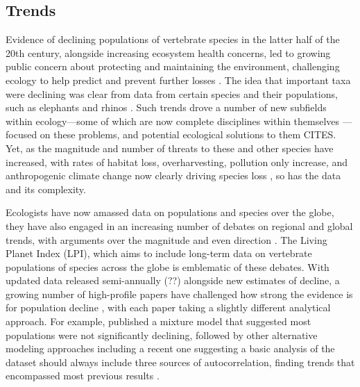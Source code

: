 \documentclass[11pt]{article}
\begin{document}
\subsection{Trends}

Evidence of declining populations of vertebrate species in the latter half of the 20th century, alongside increasing ecosystem health concerns, led to growing public concern about protecting and maintaining the environment, challenging ecology to help predict and prevent further losses \citep{soule1999conserving,soule1991conservation}. The idea that important taxa were declining was clear from data from certain species and their populations, such as elephants and rhinos \citep{soule1979benign,leader1990illegal}. Such trends drove a number of new subfields within ecology---some of which are now complete disciplines within themselves \citep[such as conservation biology,][]{soule1985conservation}---focused on these problems, and potential ecological solutions to them CITES. Yet, as the magnitude and number of threats to these and other species have increased, with rates of habitat loss, overharvesting, pollution only increase, and anthropogenic climate change now clearly driving species loss \citep{waller2017bramble}, so has the data and its complexity. 

Ecologists have now amassed data on populations and species over the globe, they have also engaged in an increasing number of debates on regional and global trends, with arguments over the magnitude and even direction \citep{Dornelas2014,Leung2020,terry2022no,muller2024weather}. The Living Planet Index (LPI), which aims to include long-term data on vertebrate populations of species across the globe is emblematic of these debates. With updated data released semi-annually (??) alongside new estimates of decline, a growing number of high-profile papers have challenged how strong the evidence is for population decline \citep{Dornelas2014,gonzalez2016estimating,wagner2021insect,muller2024weather}, with each paper taking a slightly different analytical approach. For example, \citet{Leung2020} published a mixture model that suggested most populations were not significantly declining, followed by other alternative modeling approaches \citep{Buschke2021,puurtinen2022living} including a recent one suggesting a basic analysis of the dataset should always include three sources of autocorrelation, finding trends that encompassed most previous results \citep{Johnson2024}. 
\end{document}
